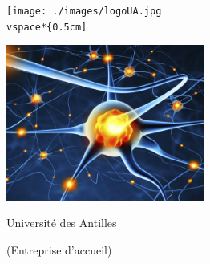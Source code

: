 \begin{titlepage}
    \enlargethispage{2cm}

    \begin{center}
        \vspace*{1cm}
        \texttt{[image: ./images/logoUA.jpg
        \\vspace*\{0.5cm]}

        \textsc{\@title}
        \HRule
        \vspace*{0.5cm}

        \large{\@author}
    \end{center}

    \begin{center}
      \vspace*{2cm}
      \includegraphics[width=6.5cm]{./images/n_a.jpg}
    \end{center}

    \vspace*{2cm}

    \begin{center}
        Université des Antilles

        (Entreprise d'accueil)
    \end{center}

\end{titlepage}
\ClearShipoutPicture
